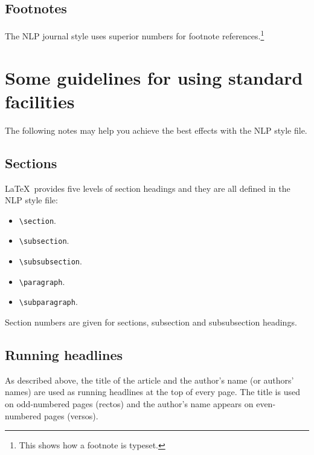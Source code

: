 \documentclass{CUP-JNL-NLP}
\begin{document}
\subsection{Footnotes}

The NLP journal style uses superior numbers for footnote
references.\footnote{This shows how a footnote is typeset.}

\section{Some guidelines for using standard facilities}

The following notes may help you achieve the best effects with the NLP style
file.

\subsection{Sections}

\LaTeX\ provides five levels of section headings and they are all
defined in the NLP style file:
\begin{itemize}
  \item \verb"\section".
  \item \verb"\subsection".
  \item \verb"\subsubsection".
  \item \verb"\paragraph".
  \item \verb"\subparagraph".
\end{itemize}
Section numbers are given for sections, subsection and subsubsection headings.

\subsection{Running headlines}

As described above, the title of the article and the author's name (or authors'
names) are used as running headlines at the top of every page.
The title is used on odd-numbered pages (rectos) and the author's name appears
on even-numbered pages (versos).
\end{document}
